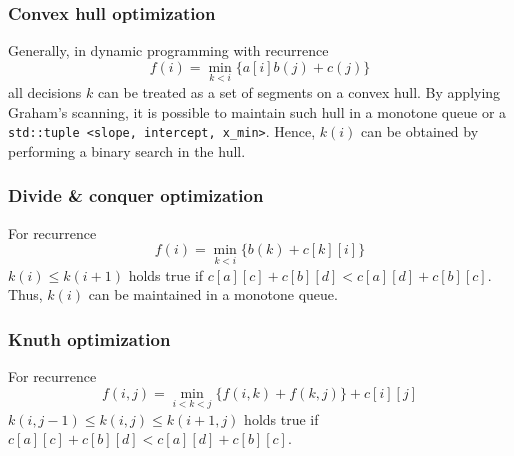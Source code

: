 \subsubsection{Convex hull optimization}
	Generally, in dynamic programming with recurrence
	$$f(i) = \min_{k<i}\{a[i]b(j)+c(j)\}$$
	all decisions $k$ can be treated as a set of segments on a convex hull.
	By applying Graham's scanning, it is possible to maintain such hull in a monotone queue or a \verb!std::tuple <slope, intercept, x_min>!.
	Hence, $k(i)$ can be obtained by performing a binary search in the hull.
\subsubsection{Divide \& conquer optimization}
	For recurrence 
	$$f(i) = \min_{k<i}\{b(k)+c[k][i]\}$$
	$k(i) \leq k(i+1)$ holds true if $c[a][c]+c[b][d]<c[a][d]+c[b][c]$.
	Thus, $k(i)$ can be maintained in a monotone queue.
\subsubsection{Knuth optimization}
	For recurrence
	$$f(i,j) = \min_{i<k<j}\{f(i,k)+f(k,j)\}+c[i][j]$$
	$k(i,j-1) \leq k(i,j) \leq k(i+1,j)$ holds true if $c[a][c]+c[b][d]<c[a][d]+c[b][c]$.

